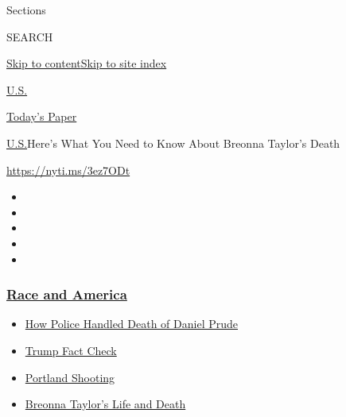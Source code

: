 Sections

SEARCH

\protect\hyperlink{site-content}{Skip to
content}\protect\hyperlink{site-index}{Skip to site index}

\href{https://www.nytimes3xbfgragh.onion/section/us}{U.S.}

\href{https://myaccount.nytimes3xbfgragh.onion/auth/login?response_type=cookie\&client_id=vi}{}

\href{https://www.nytimes3xbfgragh.onion/section/todayspaper}{Today's
Paper}

\href{/section/us}{U.S.}\textbar{}Here's What You Need to Know About
Breonna Taylor's Death

\url{https://nyti.ms/3ez7ODt}

\begin{itemize}
\item
\item
\item
\item
\item
\end{itemize}

\hypertarget{race-and-america}{%
\subsubsection{\texorpdfstring{\href{https://www.nytimes3xbfgragh.onion/news-event/george-floyd-protests-minneapolis-new-york-los-angeles?name=styln-george-floyd\&region=TOP_BANNER\&block=storyline_menu_recirc\&action=click\&pgtype=Article\&impression_id=cec905f0-f1ca-11ea-a749-0d336e81192f\&variant=undefined}{Race
and America}}{Race and America}}\label{race-and-america}}

\begin{itemize}
\tightlist
\item
  \href{https://www.nytimes3xbfgragh.onion/2020/09/04/nyregion/rochester-police-daniel-prude.html?name=styln-george-floyd\&region=TOP_BANNER\&block=storyline_menu_recirc\&action=click\&pgtype=Article\&impression_id=cec92d00-f1ca-11ea-a749-0d336e81192f\&variant=undefined}{How
  Police Handled Death of Daniel Prude}
\item
  \href{https://www.nytimes3xbfgragh.onion/2020/09/01/us/politics/trump-fact-check-protests.html?name=styln-george-floyd\&region=TOP_BANNER\&block=storyline_menu_recirc\&action=click\&pgtype=Article\&impression_id=cec92d01-f1ca-11ea-a749-0d336e81192f\&variant=undefined}{Trump
  Fact Check}
\item
  \href{https://www.nytimes3xbfgragh.onion/2020/08/30/us/portland-shooting-explained.html?name=styln-george-floyd\&region=TOP_BANNER\&block=storyline_menu_recirc\&action=click\&pgtype=Article\&impression_id=cec92d02-f1ca-11ea-a749-0d336e81192f\&variant=undefined}{Portland
  Shooting}
\item
  \href{https://www.nytimes3xbfgragh.onion/2020/08/30/us/breonna-taylor-police-killing.html?name=styln-george-floyd\&region=TOP_BANNER\&block=storyline_menu_recirc\&action=click\&pgtype=Article\&impression_id=cec92d03-f1ca-11ea-a749-0d336e81192f\&variant=undefined}{Breonna
  Taylor's Life and Death}
\end{itemize}

